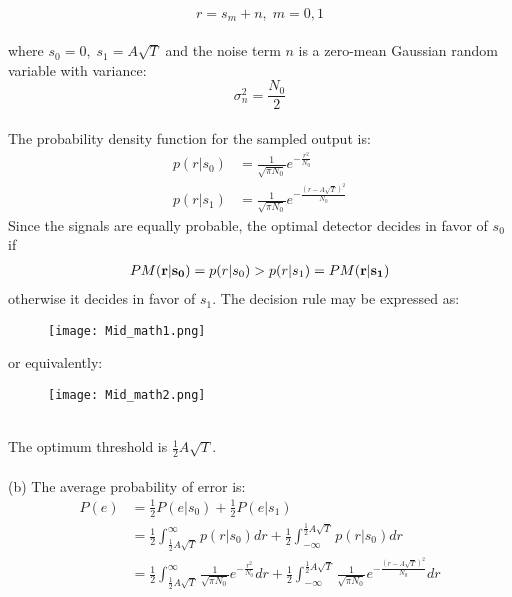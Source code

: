 \documentclass[a4paper,12pt]{article}
\begin{document}
\begin{enumerate}
            $$r = s_m + n, \; m = 0, 1$$ \\ 
            where $s_0 = 0, \; s_1 = A\sqrt{T}$ and the noise term $n$ is a zero-mean Gaussian random variable with variance:
            $$\sigma_n^2 = \frac{N_0}{2}$$ \\ 
            The probability density function for the sampled output is: \\
            \begin{align*}
                p(r|s_0) &= \frac{1}{\sqrt{\pi N_0}}e^{-\frac{r^2}{N_0}} \\ 
                p(r|s_1) &= \frac{1}{\sqrt{\pi N_0}}e^{-\frac{(r - A\sqrt{T})^2}{N_0}}
            \end{align*}
            Since the signals are equally probable, the optimal detector decides in favor of $s_0$ if 
            \begin{align*}
                PM(\bf r| \bf s_0) &= p(r|s_0) > p(r|s_1) = PM(\bf r| \bf s_1) \\
            \end{align*}
            otherwise it decides in favor of $s_1$. The decision rule may be expressed as:
            \begin{figure}[h]
            	\centering
            	\texttt{[image: Mid\_math1.png]}
            \end{figure}
            \newpage
            or equivalently: \\ 
            \begin{figure}[h]
            	\centering
            	\texttt{[image: Mid\_math2.png]}
            \end{figure} \\
            The optimum threshold is $\frac{1}{2}A\sqrt{T}$. \\ \\
            (b) The average probability of error is: \\
            \begin{align*}
                P(e) &= \frac{1}{2}P(e|s_0) + \frac{1}{2}P(e|s_1) \\
                     &= \frac{1}{2}\int_{\frac{1}{2}A\sqrt{T}}^{\infty}p(r|s_0)dr 
                      + \frac{1}{2}\int_{-\infty}^{\frac{1}{2}A\sqrt{T}}p(r|s_0)dr \\
                     &= \frac{1}{2}\int_{\frac{1}{2}A\sqrt{T}}^{\infty}\frac{1}{\sqrt{\pi N_0}}e^{-\frac{r^2}{N_0}}dr + \frac{1}{2}\int_{-\infty}^{\frac{1}{2}A\sqrt{T}}\frac{1}{\sqrt{\pi N_0}}e^{-\frac{(r - A\sqrt{T})^2}{N_0}}dr \\ 

\end{align*}
\end{enumerate}
\end{document}
